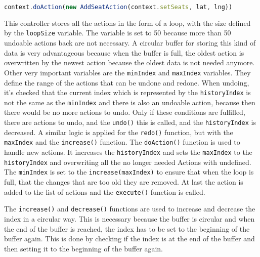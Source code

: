 \begin{lstlisting}[language=TypeScript,caption={Registering a new action in the controller},label={lst:register-action}]
context.doAction(new AddSeatAction(context.setSeats, lat, lng))
\end{lstlisting}

This controller stores all the actions in the form of a loop, with the size defined by the \texttt{loopSize} variable. The variable is set to 50 because more than 50 undoable actions back are not necessary. A circular buffer for storing this kind of data is very advantageous because when the buffer is full, the oldest action is overwritten by the newest action because the oldest data is not needed anymore. Other very important variables are the \texttt{minIndex} and \texttt{maxIndex} variables. They define the range of the actions that can be undone and redone. When undoing, it's checked that the current index which is represented by the \texttt{historyIndex} is not the same as the \texttt{minIndex} and there is also an undoable action, because then there would be no more actions to undo. Only if these conditions are fulfilled, there are actions to undo, and the \texttt{undo()} this is called, and the \texttt{historyIndex} is decreased. A similar logic is applied for the \texttt{redo()} function, but with the \texttt{maxIndex} and the \texttt{increase()} function. The \texttt{doAction()} function is used to handle new actions. It increases the \texttt{historyIndex} and sets the \texttt{maxIndex} to the \texttt{historyIndex} and overwriting all the no longer needed Actions with undefined. The \texttt{minIndex} is set to the \texttt{increase(maxIndex)} to ensure that when the loop is full, that the changes that are too old they are removed. At last the action is added to the list of actions and the \texttt{execute()} function is called.

The \texttt{increase()} and \texttt{decrease()} functions are used to increase and decrease the index in a circular way. This is necessary because the buffer is circular and when the end of the buffer is reached, the index has to be set to the beginning of the buffer again. This is done by checking if the index is at the end of the buffer and then setting it to the beginning of the buffer again.